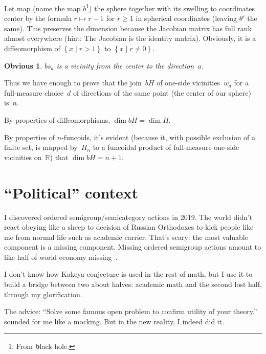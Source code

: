 \documentclass[oneside,draft]{amsart}
\newcommand{\setcond}[2]{\left\{#1\mid#2\right\}}
\newtheorem{obvious}{Obvious}
\begin{document}
Let map (name the map $b$\footnote{From \textbf{b}lack hole.}) the sphere together with its swelling to coordinates center by the formula $r\mapsto r-1$ for $r\geq 1$ in spherical coordinates (leaving $\theta'$ the same).
This preserves the dimension because the Jacobian matrix has full rank almost everywhere (hint: The Jacobian is the identity matrix).
Obviously, it is a diffeomorphism of $\setcond{x}{r>1}$ to $\setcond{x}{r\ne 0}$.

\begin{obvious}
$b s_a$ is a vicinity from the center to the direction~$a$.
\end{obvious}

Thus we have enough to prove that the join~$bH$ of one-si\-de vicinities~$w_d$ for a full-me\-a\-su\-re choice~$d$ of directions of the same point (the center of our sphere) is~$n$.

By properties of diffeomorphisms, $\dim bH = \dim H$.

By properties of $n$-fun\-co\-ids, it's evident (because it, with possible exclusion of a finite set, is mapped by~$\Pi_n$ to a funcoidal product of full-me\-a\-su\-re one-si\-de vicinities on~$\mathbb{R}$) that $\dim bH=n+1$.

\section{``Political'' context}

I discovered ordered semigroup/semicategory actions in 2019. The world didn't react obeying like a sheep to decision of Russian Orthodoxes to kick people like me from normal life such as academic carrier. That's scary: the most valuable component is a missing component. Missing ordered semigroup actions amount to like half of world economy missing~\cite{osa-important}.

I don't know how Kakeya conjecture is used in the rest of math, but I use it to build a bridge between two about halves: academic math and the second lost half, through my glorification.

The advice: ``Solve some famous open problem to confirm utility of your theory.'' sounded for me like a mocking. But in the new reality, I indeed did it.



\end{document}
